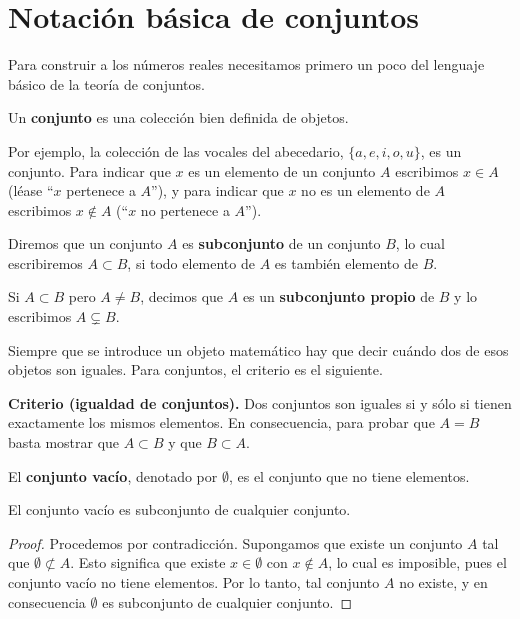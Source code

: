 \documentclass[12pt,a4paper]{book}
\begin{document}
  \section{Notación básica de conjuntos}
  
  Para construir a los números reales necesitamos primero un poco del lenguaje básico de la teoría de conjuntos.
  
  \begin{definicion}[Conjunto]
    Un \textbf{conjunto} es una colección bien definida de objetos.
  \end{definicion}
  
  Por ejemplo, la colección de las vocales del abecedario, $\{a,e,i,o,u\}$, es un conjunto. Para indicar que $x$ es un elemento de un conjunto $A$ escribimos $x \in A$ (léase ``$x$ pertenece a $A$''), y para indicar que $x$ no es un elemento de $A$ escribimos $x \notin A$ (``$x$ no pertenece a $A$'').
  
  \begin{definicion}[Subconjunto]
    Diremos que un conjunto $A$ es \textbf{subconjunto} de un conjunto $B$, lo cual escribiremos $A \subset B$, si todo elemento de $A$ es también elemento de $B$.
  \end{definicion}
  
  Si $A \subset B$ pero $A \neq B$, decimos que $A$ es un \textbf{subconjunto propio} de $B$ y lo escribimos $A \subsetneq B$.

  Siempre que se introduce un objeto matemático hay que decir cuándo dos de esos objetos son iguales. Para conjuntos, el criterio es el siguiente.
  
  \noindent\textbf{Criterio (igualdad de conjuntos).} Dos conjuntos son iguales si y sólo si tienen exactamente los mismos elementos. En consecuencia, para probar que $A=B$ basta mostrar que $A \subset B$ y que $B \subset A$.
  
  \begin{definicion}
    El \textbf{conjunto vacío}, denotado por $\emptyset$, es el conjunto que no tiene elementos.
  \end{definicion}
  
  \begin{proposicion}
    El conjunto vacío es subconjunto de cualquier conjunto.
  \end{proposicion}
  
  \begin{proof}
    Procedemos por contradicción. Supongamos que existe un conjunto $A$ tal que $\emptyset \not\subset A$. Esto significa que existe $x \in \emptyset$ con $x \notin A$, lo cual es imposible, pues el conjunto vacío no tiene elementos. Por lo tanto, tal conjunto $A$ no existe, y en consecuencia $\emptyset$ es subconjunto de cualquier conjunto.
  \end{proof}
  
\end{document}
